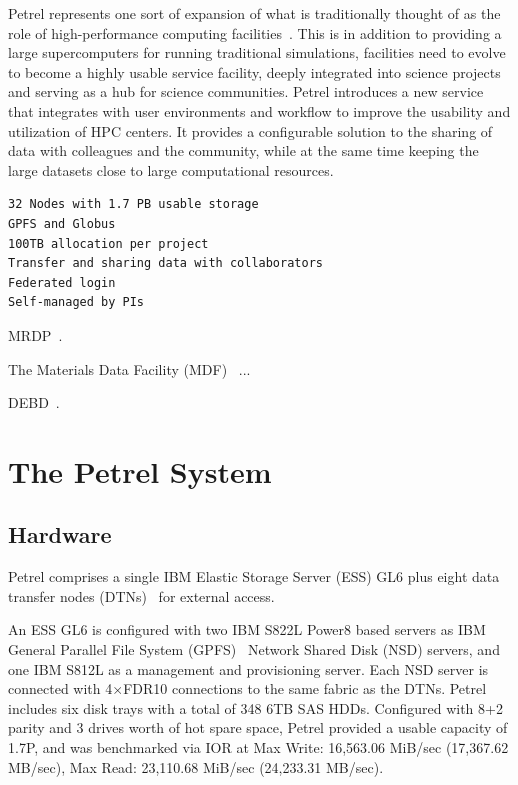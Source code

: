 \documentclass[sigconf]{acmart}
\begin{document}
Petrel represents one sort of expansion of what is traditionally thought of as the role of high-performance computing facilities~\cite{UrPa16}. 
This is in addition to providing a large supercomputers for running traditional simulations, facilities need to evolve to become a highly usable service facility, deeply integrated into science projects and serving as a hub for science communities. 
Petrel introduces a new service that integrates with user environments and workflow to improve the usability and utilization of HPC centers. 
It provides a configurable solution to the sharing of data with colleagues and the community, 
while at the  same time keeping the large datasets close to large computational resources.



\begin{verbatim}
32 Nodes with 1.7 PB usable storage
GPFS and Globus
100TB allocation per project
Transfer and sharing data with collaborators
Federated login
Self-managed by PIs
\end{verbatim}

MRDP~\cite{BMRDP}.

The Materials Data Facility (MDF)~\cite{MDF2016} ...

DEBD~\cite{foster2015networking}.


\section{The Petrel System}

\subsection{Hardware}

Petrel comprises a single IBM Elastic Storage Server (ESS) GL6 plus eight data transfer nodes (DTNs)~\cite{dart2014science} for external access.

An ESS GL6 is configured with two IBM S822L Power8 based servers as IBM General Parallel File System (GPFS)~\cite{schmuck2002gpfs} Network Shared Disk (NSD) servers, and one IBM S812L as a management and provisioning server. 
Each NSD server is connected with 4$\times$FDR10 connections to the same fabric as the DTNs. 
Petrel includes six disk trays with a total of 348 6TB SAS HDDs. 
Configured with 8+2 parity and 3 drives worth of hot spare space, Petrel provided a usable capacity of 1.7P, and was benchmarked via IOR at Max Write: 16,563.06 MiB/sec (17,367.62 MB/sec), Max Read:  23,110.68 MiB/sec (24,233.31 MB/sec).
\end{document}
